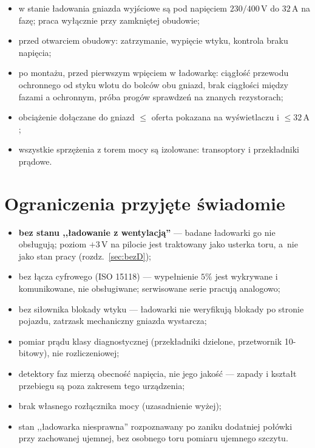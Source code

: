 \documentclass[a4paper,11pt]{article}
\newcommand{\volt}{\,\mathrm{V}}
\newcommand{\amp}{\,\mathrm{A}}
\begin{document}
\begin{itemize}
\item w stanie ładowania gniazda wyjściowe są pod napięciem $230/400\volt$ do
      $32\amp$ na fazę; praca wyłącznie przy zamkniętej obudowie;
\item przed otwarciem obudowy: zatrzymanie, wypięcie wtyku, kontrola braku napięcia;
\item po montażu, przed pierwszym wpięciem w ładowarkę: ciągłość przewodu ochronnego
      od styku wlotu do bolców obu gniazd, brak ciągłości między fazami a ochronnym,
      próba progów sprawdzeń na znanych rezystorach;
\item obciążenie dołączane do gniazd $\le$ oferta pokazana na wyświetlaczu
      i $\le 32\amp$;
\item wszystkie sprzężenia z torem mocy są izolowane: transoptory i przekładniki
      prądowe.
\end{itemize}

\section{Ograniczenia przyjęte świadomie}

\begin{itemize}
\item \textbf{bez stanu ,,ładowanie z wentylacją''} --- badane ładowarki go nie
      obsługują; poziom $+3\volt$ na pilocie jest traktowany jako usterka toru,
      a~nie jako stan pracy (rozdz.~\ref{sec:bezD});
\item bez łącza cyfrowego (ISO 15118) --- wypełnienie $5\%$ jest wykrywane
      i komunikowane, nie obsługiwane; serwisowane serie pracują analogowo;
\item bez siłownika blokady wtyku --- ładowarki nie weryfikują blokady po stronie
      pojazdu, zatrzask mechaniczny gniazda wystarcza;
\item pomiar prądu klasy diagnostycznej (przekładniki dzielone, przetwornik
      10-bitowy), nie rozliczeniowej;
\item detektory faz mierzą obecność napięcia, nie jego jakość --- zapady i kształt
      przebiegu są poza zakresem tego urządzenia;
\item brak własnego rozłącznika mocy (uzasadnienie wyżej);
\item stan ,,ładowarka niesprawna'' rozpoznawany po zaniku dodatniej połówki przy
      zachowanej ujemnej, bez osobnego toru pomiaru ujemnego szczytu.
\end{itemize}
\end{document}
